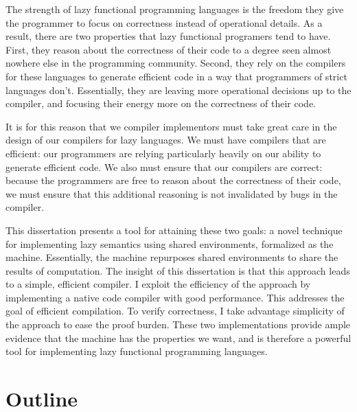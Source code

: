 The strength of lazy functional programming languages is the freedom they
give the programmer to focus on correctness instead of operational details. As a
result, there are two properties that lazy functional programers tend to have.
First, they reason about the correctness of their code to a degree seen almost
nowhere else in the programming community. Second, they rely on the compilers
for these languages to generate efficient code in a way that programmers of
strict languages don't. Essentially, they are leaving more operational
decisions up to the compiler, and focusing their energy more on the
correctness of their code. 

It is for this reason that we compiler implementors must take great care in the
design of our compilers for lazy languages. We must have compilers that are
efficient: our programmers are relying particularly heavily on our ability to
generate efficient code. We also must ensure that our compilers are correct:
because the programmers are free to reason about the correctness of their code,
we must ensure that this additional reasoning is not invalidated by bugs in the
compiler. 

This dissertation presents a tool for attaining these two goals: a novel
technique for implementing lazy semantics using shared environments, formalized
as the \ce machine. Essentially, the \ce machine repurposes shared environments
to share the results of computation. The insight of this dissertation is that
this approach leads to a simple, efficient compiler. I exploit the efficiency of
the approach by implementing a native code compiler with good performance. This
addresses the goal of efficient compilation. To verify correctness, I take
advantage simplicity of the approach to ease the proof burden. These two
implementations provide ample evidence that the \ce machine has the properties
we want, and is therefore a powerful tool for implementing lazy functional
programming languages.

\section{Outline}

